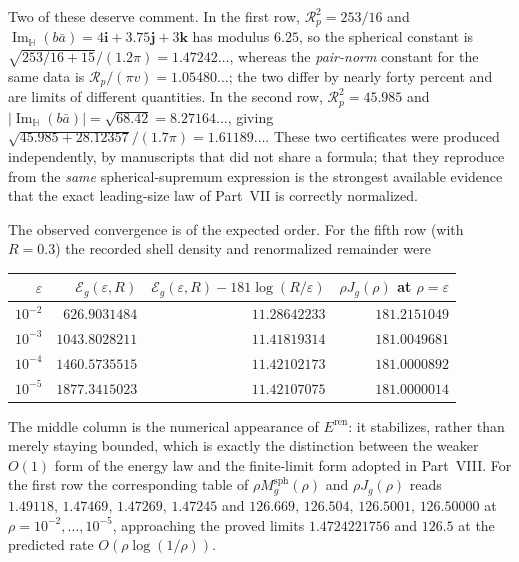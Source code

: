 \documentclass[11pt,a4paper]{article}
\numberwithin{equation}{section}
\theoremstyle{definition}
\theoremstyle{remark}
\theoremstyle{plain}
\newcommand{\HH}{\mathbb H}
\DeclareMathOperator{\Ima}{Im}
\newcommand{\ImH}{\Ima_{\HH}}
\newcommand{\Rp}{\mathcal R_{p}}      %
\newcommand{\Msph}{M^{\mathrm{sph}}}                  %
\newcommand{\Eg}{\mathcal E_{g}}
\newcommand{\Jg}{J_{g}}
\newcommand{\Eren}{E^{\mathrm{ren}}}
\newcommand{\abs}[1]{\lvert #1\rvert}
\begin{document}
Two of these deserve comment. In the first row,
$\Rp^2=253/16$ and $\ImH(b\bar a)=4\mathbf i+3.75\mathbf j+3\mathbf k$ has
modulus $6.25$, so the spherical constant is
$\sqrt{253/16+15}/(1.2\pi)=1.47242\ldots$, whereas the \emph{pair-norm}
constant for the same data is $\Rp/(\pi v)=1.05480\ldots$; the two differ
by nearly forty percent and are limits of different quantities. In the
second row, $\Rp^2=45.985$ and
$\abs{\ImH(b\bar a)}=\sqrt{68.42}=8.27164\ldots$, giving
$\sqrt{45.985+28.12357}/(1.7\pi)=1.61189\ldots$. These two certificates
were produced independently, by manuscripts that did not share a formula;
that they reproduce from the \emph{same} spherical-supremum expression is
the strongest available evidence that the exact leading-size law of
Part~VII is correctly normalized.

The observed convergence is of the expected order. For the fifth row
(with $R=0.3$) the recorded shell density and renormalized remainder were
\begin{center}
\small
\renewcommand{\arraystretch}{1.2}
\begin{tabular}{@{}rrrr@{}}
\toprule
$\varepsilon$ & $\Eg(\varepsilon,R)$ &
$\Eg(\varepsilon,R)-181\log(R/\varepsilon)$ &
$\rho\Jg(\rho)$ at $\rho=\varepsilon$\\
\midrule
$10^{-2}$ & $626.9031484$ & $11.28642233$ & $181.2151049$\\
$10^{-3}$ & $1043.8028211$ & $11.41819314$ & $181.0049681$\\
$10^{-4}$ & $1460.5735515$ & $11.42102173$ & $181.0000892$\\
$10^{-5}$ & $1877.3415023$ & $11.42107075$ & $181.0000014$\\
\bottomrule
\end{tabular}
\end{center}
The middle column is the numerical appearance of $\Eren$: it stabilizes,
rather than merely staying bounded, which is exactly the distinction
between the weaker $O(1)$ form of the energy law and the finite-limit form
adopted in Part~VIII. For the first row the corresponding table of
$\rho\Msph_g(\rho)$ and $\rho\Jg(\rho)$ reads
$1.49118,\,1.47469,\,1.47269,\,1.47245$ and
$126.669,\,126.504,\,126.5001,\,126.50000$ at
$\rho=10^{-2},\dots,10^{-5}$, approaching the proved limits
$1.4724221756$ and $126.5$ at the predicted rate $O(\rho\log(1/\rho))$.
\end{document}
